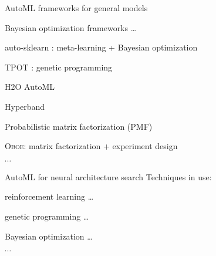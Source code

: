 \begin{frame}{AutoML frameworks for general models}
\bit
\item Bayesian optimization frameworks \cite{snoek2012practical, klein17a, zhang2016flash, thornton2013auto} \dots
\item auto-sklearn \cite{feurer2015efficient}: meta-learning + Bayesian optimization
\item TPOT \cite{Olson2016EvoBio}: genetic programming
\item H2O AutoML
\item Hyperband \cite{JMLR:v18:16-558}
\item Probabilistic matrix factorization (PMF) \cite{fusi2018probabilistic}
\item \textsc{Oboe}: matrix factorization + experiment design \cite{yang2019oboe}
\item $\cdots$
\eit

\end{frame}

\begin{frame}{AutoML for neural architecture search}
Techniques in use:
\bit
\item reinforcement learning \cite{45826} \dots
\item genetic programming \cite{suganuma2017genetic} \dots
\item Bayesian optimization \cite{Jin:2019:AEN:3292500.3330648} \dots
\item $\cdots$
\eit
\end{frame}

